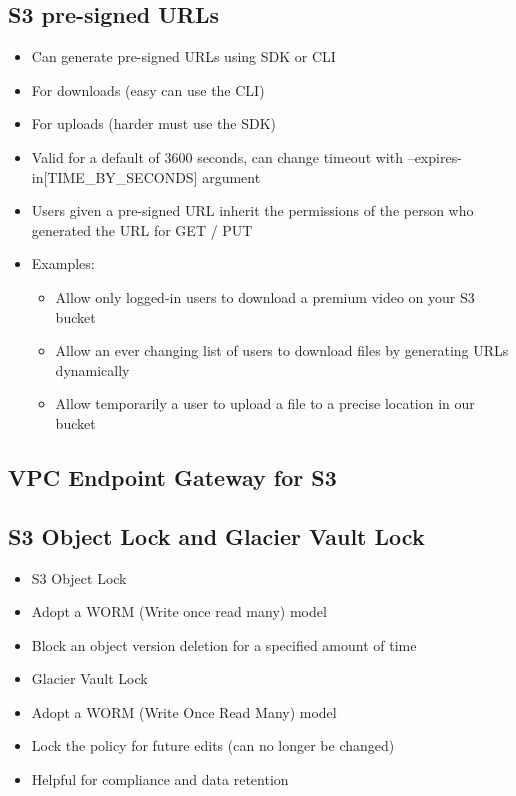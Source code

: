 \subsection{S3 pre-signed URLs}
\begin{itemize}
    \item Can generate pre-signed URLs using SDK or CLI
    \item For downloads (easy can use the CLI)
    \item For uploads (harder must use the SDK)
    \item Valid for a default of 3600 seconds, can change timeout with --expires-in[TIME_BY_SECONDS] argument
    \item Users given a pre-signed URL inherit the permissions of the person who generated the URL for GET / PUT
    \item Examples:
    \begin{itemize}
        \item Allow only logged-in users to download a premium video on your S3 bucket
        \item Allow an ever changing list of users to download files by generating URLs dynamically
        \item Allow temporarily a user to upload a file to a precise location in our bucket
    \end{itemize}
\end{itemize}

\subsection{VPC Endpoint Gateway for S3}

\subsection{S3 Object Lock and Glacier Vault Lock}
\begin{itemize}
    \item S3 Object Lock
    \item Adopt a WORM (Write once read many) model
    \item Block an object version deletion for a specified amount of time
    \item Glacier Vault Lock
    \item Adopt a WORM (Write Once Read Many) model
    \item Lock the policy for future edits (can no longer be changed)
    \item Helpful for compliance and data retention
\end{itemize}


